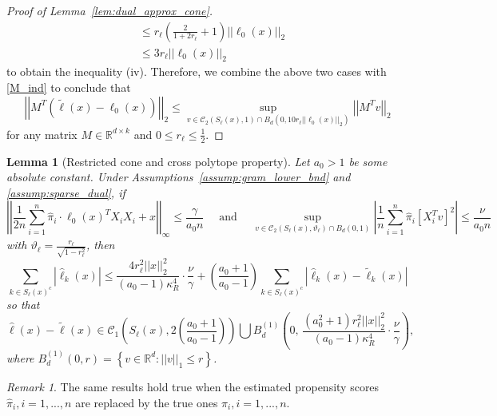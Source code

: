 \documentclass[ejsv2,noshowframe]{imsart}
\theoremstyle{plain}
\newtheorem{lemma}[theorem]{Lemma}
\theoremstyle{definition}
\theoremstyle{remark}
\newtheorem{remark}{Remark}
\newcommand{\norm}[1]{\left|\left| #1 \right|\right|}
\renewcommand{\hat}{\widehat}
\renewcommand{\tilde}{\widetilde}
\begin{document}
\begin{proof}[Proof of Lemma~\ref{lem:dual_approx_cone}]
\begin{align*}
		&\leq r_{\ell}\left(\frac{2}{1+2r_{\ell}} + 1\right) \norm{\ell_0(x)}_2\\
		&\leq 3r_{\ell} \norm{\ell_0(x)}_2
	\end{align*}
	to obtain the inequality (iv). Therefore, we combine the above two cases with \eqref{M_ind} to conclude that 
	$$\norm{M^T\left(\tilde{\ell}(x)-\ell_0(x)\right)}_2 \leq \sup_{v\in \mathcal{C}_2(S_{\ell}(x),1) \cap B_d\left(0,10r_{\ell}\norm{\ell_0(x)}_2\right)} \norm{M^T v}_2$$ 
	for any matrix $M\in \mathbb{R}^{d\times k}$ and $0\leq r_{\ell} \leq \frac{1}{2}$.
\end{proof}

\vspace{3mm}

\begin{lemma}[Restricted cone and cross polytope property]
	\label{lem:res_cross_poly}
	Let $a_0 >1$ be some absolute constant. Under Assumptions~\ref{assump:gram_lower_bnd} and \ref{assump:sparse_dual}, if 
	\begin{equation}
		\label{res_cross_poly_cond}
		\norm{\frac{1}{2n}\sum_{i=1}^n \hat{\pi}_i\cdot \ell_0(x)^T X_i X_i +x}_{\infty} \leq \frac{\gamma}{a_0 n} \quad \text{ and } \quad \sup_{v\in \mathcal{C}_2\left(S_{\ell}(x), \vartheta_{\ell}\right)\cap B_d(0,1)} \left|\frac{1}{n} \sum_{i=1}^n \hat{\pi}_i\left[X_i^Tv\right]^2 \right| \leq \frac{\nu}{a_0 n}
	\end{equation}
	with $\vartheta_{\ell} = \frac{r_{\ell}}{\sqrt{1-r_{\ell}^2}}$, then
	$$\sum_{k\in S_{\ell}(x)^c} \left|\hat{\ell}_k(x) \right| \leq \frac{4r_{\ell}^2 \norm{x}_2^2}{(a_0-1) \kappa_R^4}\cdot \frac{\nu}{\gamma} + \left(\frac{a_0+1}{a_0-1}\right) \sum_{k\in S_{\ell}(x)^c} \left|\hat{\ell}_k(x) -\tilde{\ell}_k(x) \right|$$
	so that 
	$$\hat{\ell}(x)-\tilde{\ell}(x) \in \mathcal{C}_1\left(S_{\ell}(x), 2\left(\frac{a_0+1}{a_0-1}\right) \right) \bigcup B_d^{(1)}\left(0,\, \frac{(a_0^2+1)r_{\ell}^2 \norm{x}_2^2}{(a_0-1) \kappa_R^4} \cdot \frac{\nu}{\gamma}\right),$$ where $B_d^{(1)}(0,r) = \left\{v\in \mathbb{R}^d: \norm{v}_1 \leq r\right\}$.
\end{lemma}

\begin{remark}
	The same results hold true when the estimated propensity scores $\hat{\pi}_i,i=1,...,n$ are replaced by the true ones $\pi_i,i=1,...,n$.
\end{remark}
\end{document}
